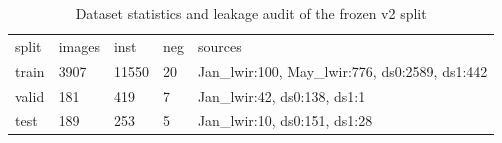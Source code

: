 \begin{table}[t]\centering\small\caption{Dataset statistics and leakage audit of the frozen v2 split}
\label{tab:t1datasetleakage}
\begin{tabular}{|lllll|}\hline
split & images & inst & neg & sources\\
train & 3907 & 11550 & 20 & Jan_lwir:100, May_lwir:776, ds0:2589, ds1:442\\
valid & 181 & 419 & 7 & Jan_lwir:42, ds0:138, ds1:1\\
test & 189 & 253 & 5 & Jan_lwir:10, ds0:151, ds1:28\\
\hline\end{tabular}\end{table}
